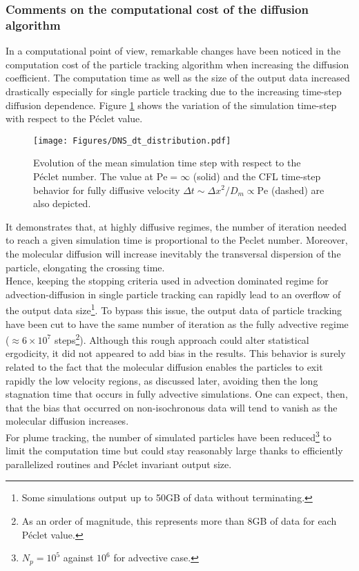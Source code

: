 \subsubsection{Comments on the computational cost of the diffusion algorithm}
In a computational point of view, remarkable changes have been noticed in the computation cost of the particle tracking algorithm when increasing the diffusion coefficient.
The computation time as well as the size of the output data increased drastically especially for single particle tracking due to the increasing time-step diffusion dependence.
Figure \ref{fig:time_step_pe} shows the variation of the simulation time-step with respect to the Péclet value. 
\begin{figure}[h!]
	\centering
	\texttt{[image: Figures/DNS\_dt\_distribution.pdf]}
	\caption{Evolution of the mean simulation time step with respect to the Péclet number. The value at $\mathrm{Pe} = \infty$ (solid) and the CFL time-step behavior for fully diffusive velocity $\Delta t\sim \Delta x^2/D_m \propto\mathrm{Pe}$ (dashed) are also depicted.}
	\label{fig:time_step_pe}
\end{figure}
It demonstrates that, at highly diffusive regimes, the number of iteration needed to reach a given simulation time is proportional to the Peclet number.
Moreover, the molecular diffusion will increase inevitably the transversal dispersion of the particle, 
elongating the crossing time.\\
Hence, keeping the stopping criteria used in advection dominated regime for advection-diffusion in single particle tracking can rapidly lead to an overflow of the output data size\footnote{Some simulations output up to 50GB of data without terminating.}.
To bypass this issue, the output data of particle tracking have been cut to have the same number of iteration as the fully advective regime ($\approx6 \times 10^7$ steps\footnote{As an order of magnitude, this represents more than 8GB of data for each Péclet value.}). 
Although this rough approach could alter statistical ergodicity, it did not appeared to add bias in the results. 
This behavior is surely related to the fact that the molecular diffusion enables the particles to exit rapidly the low velocity regions, as discussed later, avoiding then the long stagnation time that occurs in fully advective simulations. 
One can expect, then, that the bias that occurred on non-isochronous data will tend to vanish as the molecular diffusion increases.\\
For plume tracking, the number of simulated particles have been reduced\footnote{$N_p=10^5$ against $10^6$ for advective case.} to limit the computation time but could stay reasonably large thanks to efficiently parallelized routines and Péclet invariant output size.

